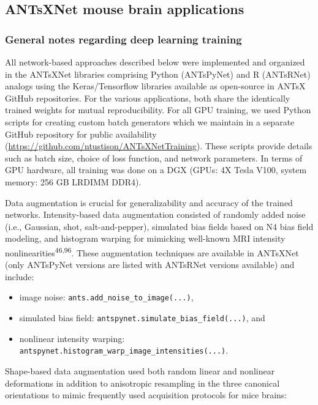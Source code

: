 \documentclass[
  12pt,
]{article}
\begin{document}
\subsection{ANTsXNet mouse brain
applications}\label{antsxnet-mouse-brain-applications}

\subsubsection{General notes regarding deep learning
training}\label{general-notes-regarding-deep-learning-training}

All network-based approaches described below were implemented and
organized in the ANTsXNet libraries comprising Python (ANTsPyNet) and R
(ANTsRNet) analogs using the Keras/Tensorflow libraries available as
open-source in ANTsX GitHub repositories. For the various applications,
both share the identically trained weights for mutual reproducibility.
For all GPU training, we used Python scripts for creating custom batch
generators which we maintain in a separate GitHub repository for public
availability (\url{https://github.com/ntustison/ANTsXNetTraining}).
These scripts provide details such as batch size, choice of loss
function, and network parameters. In terms of GPU hardware, all training
was done on a DGX (GPUs: 4X Tesla V100, system memory: 256 GB LRDIMM
DDR4).

Data augmentation is crucial for generalizability and accuracy of the
trained networks. Intensity-based data augmentation consisted of
randomly added noise (i.e., Gaussian, shot, salt-and-pepper), simulated
bias fields based on N4 bias field modeling, and histogram warping for
mimicking well-known MRI intensity
nonlinearities\textsuperscript{46,96}. These augmentation techniques are
available in ANTsXNet (only ANTsPyNet versions are listed with ANTsRNet
versions available) and include:

\begin{itemize}
\item
  image noise: \texttt{ants.add\_noise\_to\_image(...)},
\item
  simulated bias field: \texttt{antspynet.simulate\_bias\_field(...)},
  and
\item
  nonlinear intensity warping:
  \texttt{antspynet.histogram\_warp\_image\_intensities(...)}.
\end{itemize}

Shape-based data augmentation used both random linear and nonlinear
deformations in addition to anisotropic resampling in the three
canonical orientations to mimic frequently used acquisition protocols
for mice brains:
\end{document}
